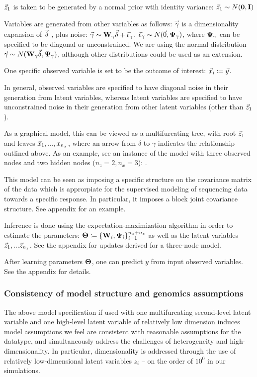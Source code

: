 $\vec{z}_1$ is taken to be generated by a normal prior wtih identity variance: $\vec{z}_1 \sim N(\mathbf{0}, \mathbf{I})$

Variables are generated from other variables as follows: ${\vec{\gamma}}$ is a dimensionality expansion of $\vec{\delta}$ , plus noise:  $\vec{\gamma} \sim \bold{W} _\gamma \vec{\delta} + \vec{\epsilon}_\gamma$. $\vec{\epsilon}_\gamma \sim N(\vec{0} , \bold{\Psi}_\gamma)$, where $\bold{\Psi}_\gamma$ can be specified to be diagonal or unconstrained. We are using the normal distribution $\vec{\gamma} \sim N(\bold{W}_\gamma \vec{\delta}, \bold{\Psi}_\gamma)$, although other distributions could be used as an extension.

One specific observed variable is set to be the outcome of interest: $\vec{x}_i \coloneqq \vec{y}$. 

In general, observed variables are specified to have diagonal noise in their generation from latent variables, whereas latent variables are specified to have unconstrained noise in their generation from other latent variables (other than $\vec{z}_1$). 


As a graphical model, this can be viewed as a multifurcating tree, with root $\vec{z}_1$ and leaves $\vec{x}_1, ..., x_{n_x}$, where an arrow from $\delta$ to $\gamma$ indicates the relationship outlined above. As an example, see an instance of the model with three observed nodes and two hidden nodes ($n_z = 2, n_x = 3$): .


This model can be seen as imposing a specific structure on the covariance matrix of the data which is approrpiate for the supervised modeling of sequencing data towards a specific response. In particular, it imposes a block joint covariance structure. See appendix for an example.  

Inference is done using the expectation-maximization algorithm in order to estimate the parameters: $\bold{\Theta} \coloneqq \left\{\bold{W}_i, \bold{\Psi}_i \right\}_{i=1}^{n_x + n_z}$ as well as the latent variables $\vec{z}_1,... \vec{z}_{n_z}$. See the appendix for updates derived for a three-node model. 


After learning parameters $\bold{\Theta}$, one can predict $y$ from input observed variables. See the appendix for details.

\subsubsection{Consistency of model structure and genomics assumptions}

The above model specification if used with one multifurcating second-level latent variable and one high-level latent variable of relatively low dimension induces model assumptions we feel are consistent with reasonable assumptions for the datatype, and simultaneously address the challenges of heterogeneity and high-dimensionality. In particular, dimensionality is addressed through the use of relatively low-dimensional latent variables $z_i$ -- on the order of $10^0$ in our simulations.

